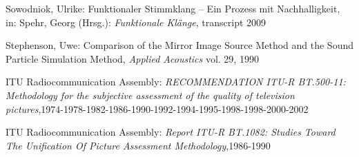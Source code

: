 \begin{thebibliography}{}
Sowodniok, Ulrike: 
\glqq Funktionaler Stimmklang -- Ein Prozess mit Nachhalligkeit\grqq, 
in: Spehr, Georg (Hrsg.): \emph{Funktionale Klänge}, transcript 2009




Stephenson, Uwe: 
\glqq Comparison of the Mirror Image Source Method and the Sound Particle Simulation Method\grqq, 
\emph{Applied Acoustics} vol. 29, 1990

ITU Radiocommunication Assembly:
\emph{RECOMMENDATION ITU-R BT.500-11: Methodology for the subjective assessment of the quality of television pictures},1974-1978-1982-1986-1990-1992-1994-1995-1998-1998-2000-2002

ITU Radiocommunication Assembly:
\emph{Report ITU-R BT.1082: Studies Toward The Unification Of Picture Assessment Methodology},1986-1990

\end{thebibliography}

\clearpage\thispagestyle{empty}
\eigen  %












